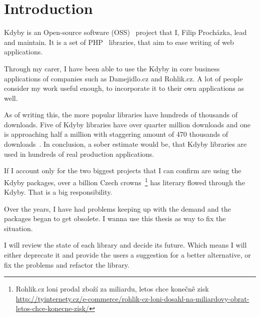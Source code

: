 \chapter{Introduction}

Kdyby is an Open-source software (OSS)~\cite{wiki:oss} project that I, Filip Procházka, lead and maintain. It is a set of PHP~\cite{wiki:php} libraries, that aim to ease writing of web applications.

Through my carer, I have been able to use the Kdyby in core business applications of companies such as Damejidlo.cz and Rohlik.cz. A lot of people consider my work useful enough, to incorporate it to their own applications as well.

As of writing this, the more popular libraries have hundreds of thousands of downloads. Five of Kdyby libraries have over quarter million downloads and one is approaching half a million with staggering amount of 470 thousands of downloads~\cite{packagist:kdyby}. In conclusion, a sober estimate would be, that Kdyby libraries are used in hundreds of real production applications.

If I account only for the two biggest projects that I can confirm are using the Kdyby packages, over a billion Czech crowns~\footnote{Rohlik.cz loni prodal zboží za miliardu, letos chce konečně zisk \\\url{http://tyinternety.cz/e-commerce/rohlik-cz-loni-dosahl-na-miliardovy-obrat-letos-chce-konecne-zisk/}} has literary flowed through the Kdyby. That is a big responsibility.

Over the years, I have had problems keeping up with the demand and the packages began to get obsolete. I wanna use this thesis as way to fix the situation.

I will review the state of each library and decide its future. Which means I will either deprecate it and provide the users a suggestion for a better alternative, or fix the problems and refactor the library.
